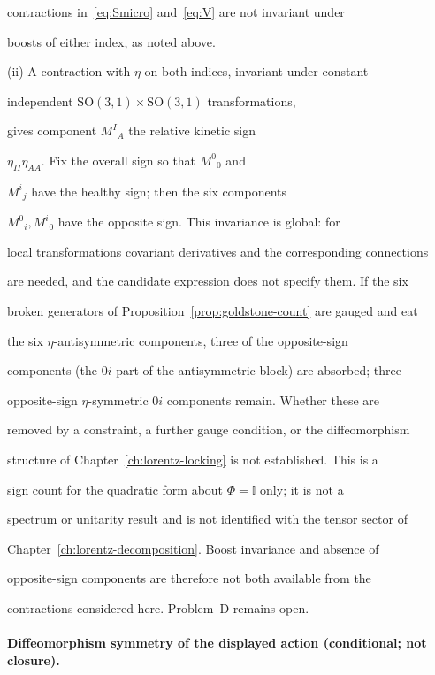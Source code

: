 contractions in~\eqref{eq:Smicro} and~\eqref{eq:V} are not invariant under

boosts of either index, as noted above.

(ii) A contraction with \(\eta\) on both indices, invariant under constant

independent \(\mathrm{SO}(3,1)\times\mathrm{SO}(3,1)\) transformations,

gives component \(M^I{}_A\) the relative kinetic sign

\(\eta_{II}\eta_{AA}\). Fix the overall sign so that \(M^0{}_0\) and

\(M^i{}_j\) have the healthy sign; then the six components

\(M^0{}_i,M^i{}_0\) have the opposite sign. This invariance is global: for

local transformations covariant derivatives and the corresponding connections

are needed, and the candidate expression does not specify them. If the six

broken generators of Proposition~\ref{prop:goldstone-count} are gauged and eat

the six \(\eta\)-antisymmetric components, three of the opposite-sign

components (the \(0i\) part of the antisymmetric block) are absorbed; three

opposite-sign \(\eta\)-symmetric \(0i\) components remain. Whether these are

removed by a constraint, a further gauge condition, or the diffeomorphism

structure of Chapter~\ref{ch:lorentz-locking} is not established. This is a

sign count for the quadratic form about \(\Phi=\mathbb{I}\) only; it is not a

spectrum or unitarity result and is not identified with the tensor sector of

Chapter~\ref{ch:lorentz-decomposition}. Boost invariance and absence of

opposite-sign components are therefore not both available from the

contractions considered here. Problem~D remains open.





\paragraph{Diffeomorphism symmetry of the displayed action (conditional; not closure).} \label{detail:sec-C-paragraphdiffeomorphismsymmetr-15}

